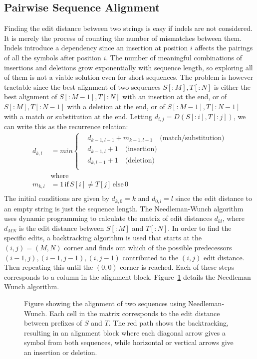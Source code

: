 \subsection{Pairwise Sequence Alignment}
\label{sec:pairwise}
Finding the edit distance between two strings is easy if indels are not considered.
It is merely the process of counting the number of mismatches between them.
Indels introduce a dependency since an insertion at position $i$ affects the pairings of all the symbols after position $i$.
The number of meaningful combinations of insertions and deletions grow exponentially with sequence length, so exploring all of them is not a viable solution even for short sequences.
The problem is however tractable since the best alignment of two sequences $S[:M], T[:N]$ is either the best alignment of $S[:M-1], T[:N]$ with an insertion at the end, or of $S[:M], T[:N-1]$ with a deletion at the end, or of $S[:M-1], T[:N-1]$ with a match or substitution at the end. 
Letting $d_{i,j} = D(S[:i], T[:j])$, we can write this as the recurrence relation:
\begin{align*}
  d_{k,l} &= min\begin{cases}
  &d_{k-1,l-1}+m_{k-1, l-1}\quad \text{(match/substitution)}\\
  &d_{k-1,l}+1 \quad \text{(insertion)}\\
  &d_{k, l-1}+1 \quad \text{(deletion)}\\
\end{cases}
  \\
  &\text{where}\\
  m_{k, l} &= 1\, \text{if}\, S[i] \neq T[j]\, \text{else}\, 0\\
\end{align*}
The initial conditions are given by $d_{k, 0}=k$ and $d_{0,l}=l$ since the edit distance to an empty string is just the sequence length.
The Needleman-Wunch algorithm~\cite{needlemanwunch} uses dynamic programming to calculate the matrix of edit distances $d_{kl}$, where $d_{MN}$ is the edit distance between $S[:M]$ and $T[:N]$.
In order to find the specific edits, a backtracking algorithm is used that starts at the $(i, j) = (M, N)$ corner and finds out which of the possible predecessors $(i-1, j), (i-1, j-1), (i, j-1)$ contributed to the $(i, j)$ edit distance.
Then repeating this until the $(0, 0)$ corner is reached. Each of these steps corresponds to a column in the alignment block.
Figure~\ref{fig:needle} details the Needleman Wunch algorithm.
\begin{figure}
  \begin{tikzpicture}
    
  \end{tikzpicture}
  \caption{Figure showing the alignment of two sequences using Needleman-Wunch. Each cell in the matrix corresponds to the edit distance between prefixes of $S$ and $T$. The red path shows the backtracking, resulting in an alignment block where each diagonal arrow gives a symbol from both sequences, while horizontal or vertical arrows give an insertion or deletion.}
  \label{fig:needle}
\end{figure}

